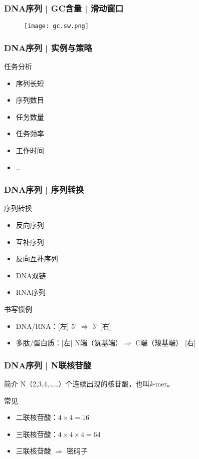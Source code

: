 \begin{frame}
  \frametitle{DNA序列 | GC含量 | 滑动窗口}
  \begin{figure}
    \centering
    \texttt{[image: gc.sw.png]}
  \end{figure}
\end{frame}

\begin{frame}
  \frametitle{DNA序列 | \alert{实例与策略}}
  \pause
  \begin{block}{任务分析}
    \begin{itemize}
      \item 序列长短
      \item 序列数目
      \item 任务数量
      \item 任务频率
      \item 工作时间
      \item \ldots
    \end{itemize}
  \end{block}
\end{frame}

\begin{frame}
  \frametitle{DNA序列 | 序列转换}
  \begin{block}{序列转换}
    \begin{itemize}
      \item 反向序列
      \item 互补序列
      \item 反向互补序列
      \item DNA双链
      \item RNA序列
    \end{itemize}
  \end{block}
  \pause
  \begin{block}{书写惯例}
    \begin{itemize}
      \item DNA/RNA：[左] 5' $\Longrightarrow$ 3' [右]
      \item 多肽/蛋白质：[左] N端（氨基端）$\Longrightarrow$ C端（羧基端） [右]
    \end{itemize}
  \end{block}
\end{frame}

\begin{frame}
  \frametitle{DNA序列 | N联核苷酸}
  \begin{block}{简介}
    N（2,3,4,……）个连续出现的核苷酸，也叫\textit{k}-mer。
  \end{block}
  \pause
  \begin{block}{常见}
    \begin{itemize}
      \item 二联核苷酸：$4 \times 4 = 16$
      \item 三联核苷酸：$4 \times 4 \times 4 = 64$
      \item 三联核苷酸 $\Longrightarrow$ 密码子
    \end{itemize}
  \end{block}
\end{frame}

